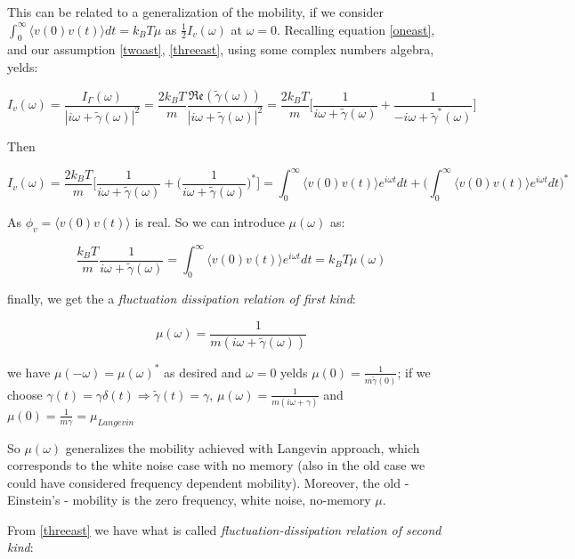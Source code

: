 \documentclass{article}
\begin{document}
This can be related to a generalization of the mobility, if we consider $\int_{0}^{\infty} \langle v(0)v(t) \rangle dt = k_B T \mu$ as $\frac{1}{2} I_v(\omega)$ at $\omega=0$.
Recalling equation \ref{oneast}, and our assumption \ref{twoast}, \ref{threeast}, using some complex numbers algebra, yelds:

$$I_v(\omega) = \frac{I_{\Gamma}(\omega)}{ |i\omega + \widetilde{\gamma}(\omega)|^2} = \frac{2 k_B T}{m} \frac{ \mathfrak{Re} ( \widetilde{\gamma}(\omega)) }{|i\omega + \widetilde{\gamma}(\omega)|^2} =  \frac{2 k_B T}{m}\bigg [ \frac{1}{i\omega + \widetilde{\gamma}(\omega)} +  \frac{1}{-i\omega + \widetilde{\gamma}^*(\omega)} \bigg ]$$

Then 

$$I_v(\omega) = \frac{2 k_B T}{m}\bigg [ \frac{1}{i\omega + \widetilde{\gamma}(\omega)} +  \Big ( \frac{1}{i\omega + \widetilde{\gamma}(\omega)} \Big )^* \bigg ]  = \int_{0}^{\infty} \langle v(0)v(t) \rangle e^{i \omega t} dt + \big( \int_{0}^{\infty} \langle v(0)v(t) \rangle e^{i \omega t} dt \big)^*$$

As $\phi_v = \langle v(0)v(t) \rangle $ is real. So we can introduce $\mu(\omega)$ as:

$$
\frac{ k_B T}{m} \frac{1}{i\omega + \widetilde{\gamma}(\omega)} = \int_{0}^{\infty} \langle v(0)v(t) \rangle e^{i \omega t} dt  = k_B T \mu(\omega) 	
$$

finally, we get the a \emph{fluctuation dissipation relation of first kind}:

\begin{equation}
\mu(\omega) = \frac{1}{m(i\omega + \widetilde{\gamma}(\omega))}
\label{fdfirst}
\end{equation}

we have $\mu(-\omega) = \mu(\omega)^*$ as desired and $\omega = 0 $ yelds $\mu(0)= \frac{1}{m\widetilde{\gamma}(0)}$; if we choose $\gamma(t) = \gamma \delta(t) \Rightarrow \widetilde{\gamma}(t)=\gamma$, $\mu(\omega) = \frac{1}{m(i\omega + \gamma) }$ and $\mu(0) = \frac{1}{m \gamma} = \mu_{Langevin}$

So $\mu(\omega)$ generalizes the mobility achieved with Langevin approach, which corresponds to the white noise case with no memory (also in the old case we could have considered frequency dependent mobility). Moreover, the old - Einstein's - mobility is the zero frequency, white noise, no-memory $\mu$.

From \ref{threeast} we have what is called \emph{fluctuation-dissipation relation of second kind}:
\end{document}
